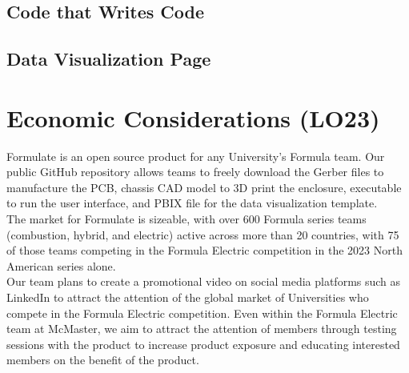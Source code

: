 \documentclass{article}
\begin{document}
\subsection{Code that Writes Code}

\subsection{Data Visualization Page}






\section{Economic Considerations (LO23)}


Formulate is an open source product for any University's Formula team. Our public GitHub repository allows teams to freely download the Gerber files to manufacture the PCB, chassis CAD model to 3D print the enclosure, executable to run the user interface, and PBIX file for the data visualization template. \\

The market for Formulate is sizeable, with over 600 Formula series teams (combustion, hybrid, and electric) active across more than 20 countries, with 75 of those teams competing in the Formula Electric competition in the 2023 North American series alone. \\

Our team plans to create a promotional video on social media platforms such as LinkedIn to attract the attention of the global market of Universities who compete in the Formula Electric competition. Even within the Formula Electric team at McMaster, we aim to attract the attention of members through testing sessions with the product to increase product exposure and educating interested members on the benefit of the product. \\
\end{document}
